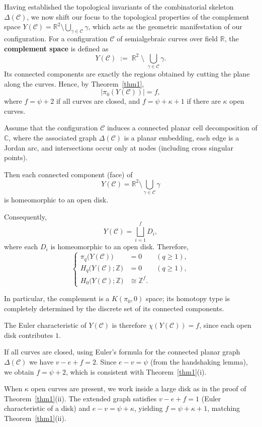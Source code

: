 \documentclass[article,11pt]{amsart} \numberwithin{equation}{section}
\numberwithin{equation}{section}
\begin{document}
{Having established the topological invariants of the combinatorial skeleton $\Delta(\mathcal{C})$, we now shift our focus to the topological properties of the complement space $Y(\mathcal{C}) = \mathbb{R}^2 \setminus \bigcup_{\gamma\in\mathcal{C}} \gamma$, which acts as the geometric manifestation of our configuration. 
For a configuration $\mathcal{C}$ of semialgebraic curves over field $\mathbb{R}$, the \textbf{complement space} is defined as
\[
Y(\mathcal{C}) \;:=\; \mathbb{R}^2 \;\setminus\; \bigcup_{\gamma\in\mathcal{C}} \gamma .
\]
Its connected components are exactly the regions obtained by cutting the plane along the curves.  Hence, by Theorem~\ref{thm1},
\[
\lvert \pi_0(Y(\mathcal{C})) \rvert = f,
\]
where $f = \psi+2$ if all curves are closed, and $f = \psi+\kappa+1$ if there are $\kappa$ open curves.

Assume that the configuration $\mathcal C$ induces a connected planar
cell decomposition of $\mathbb C$, where the associated graph
$\Delta(\mathcal C)$ is a planar embedding, each edge is a Jordan arc,
and intersections occur only at nodes (including cross singular points).

Then each connected component (face) of
\[
Y(\mathcal C)
=
\mathbb R^2
\setminus
\bigcup_{\gamma\in\mathcal C}\gamma
\]
is homeomorphic to an open disk.

Consequently,
\[
Y(\mathcal C)
=
\bigsqcup_{i=1}^{f}D_i,
\]
where each $D_i$ is homeomorphic to an open disk. Therefore,
\[
\left\{
\begin{aligned}
	\pi_q\bigl(Y(\mathcal C)\bigr)
	&=
	0
	\qquad (q\ge1),\\[2mm]
	H_q\bigl(Y(\mathcal C);\mathbb Z\bigr)
	&=
	0
	\qquad (q\ge1),\\[2mm]
	H_0\bigl(Y(\mathcal C);\mathbb Z\bigr)
	&\cong
	\mathbb Z^f.
\end{aligned}
\right.
\]

In particular, the complement is a $K(\pi_0,0)$ space; its homotopy type is completely determined by the discrete set of its connected components.

The Euler characteristic of $Y(\mathcal{C})$ is therefore $\chi(Y(\mathcal{C})) = f$, since each open disk contributes $1$.

If all curves are closed, using Euler's formula for the connected planar graph $\Delta(\mathcal{C})$ we have $v - e + f = 2$. Since $e - v = \psi$ (from the handshaking lemma), we obtain $f = \psi + 2$, which is consistent with Theorem~\ref{thm1}(i).

When $\kappa$ open curves are present, we work inside a large disk as in the proof of Theorem~\ref{thm1}(ii). The extended graph satisfies $v - e + f = 1$ (Euler characteristic of a disk) and $e - v = \psi + \kappa$, yielding $f = \psi + \kappa + 1$, matching Theorem~\ref{thm1}(ii).

}
\end{document}
